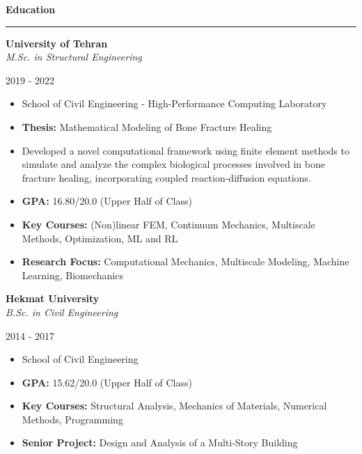 \documentclass[11pt]{article}  %
\newenvironment{rSection}[1]{  %
    \vspace{0.5em}  %
    {\Large\bfseries\color{primary} #1}  %
    \vspace{0.3em}  %
    {\color{primary}\hrule height 2pt}  %
    \vspace{0.3em}  %
}{
    \vspace{0.05em}  %
}
\newenvironment{rSubsection}[4]{  %
    \vspace{0.1em}  %
    \begin{minipage}[t]{0.8\textwidth}  %
        \raggedright  %
        \textbf{#1} \\ \textit{\color{lighttext}#3}  %
    \end{minipage}%
    \hfill%
    \begin{minipage}[t]{0.2\textwidth}  %
        \raggedleft  %
        \color{lighttext}#2 \\ \textit{\color{lighttext}#4}  %
    \end{minipage}
    \vspace{-0.2em}  %
    \begin{itemize}[leftmargin=*,labelsep=0.4em,topsep=0pt,partopsep=0pt,parsep=0pt,itemsep=0.1em]  %
}{
    \end{itemize}
    \vspace{0.1em}  %
}
\begin{document}
\begin{rSection}{Education}  %
    \begin{rSubsection}{\color{primary}University of Tehran}{2019 - 2022}{M.Sc. in Structural Engineering}{}  %
        \item School of Civil Engineering - High-Performance Computing Laboratory  %
        \item \textbf{Thesis:} Mathematical Modeling of Bone Fracture Healing  %
        \item \small{Developed a novel computational framework using finite element methods to simulate and analyze the complex biological processes involved in bone fracture healing, incorporating coupled reaction-diffusion equations.}  %
        \item \textbf{GPA:} 16.80/20.0 (Upper Half of Class)  %
        \item \textbf{Key Courses:} (Non)linear FEM, Continuum Mechanics, Multiscale Methods, Optimization, ML and RL  %
        \item \textbf{Research Focus:} Computational Mechanics, Multiscale Modeling, Machine Learning, Biomechanics  %
        \end{rSubsection}

\vspace{1em}

\begin{rSubsection}{\color{primary}Hekmat University}{2014 - 2017}{B.Sc. in Civil Engineering}{}  %
    \item School of Civil Engineering
    \item \textbf{GPA:} 15.62/20.0 (Upper Half of Class)  %
    \item \textbf{Key Courses:} Structural Analysis, Mechanics of Materials, Numerical Methods, Programming  %
    \item \textbf{Senior Project:} Design and Analysis of a Multi-Story Building  %
    \end{rSubsection}
\end{rSection}
\end{document}
